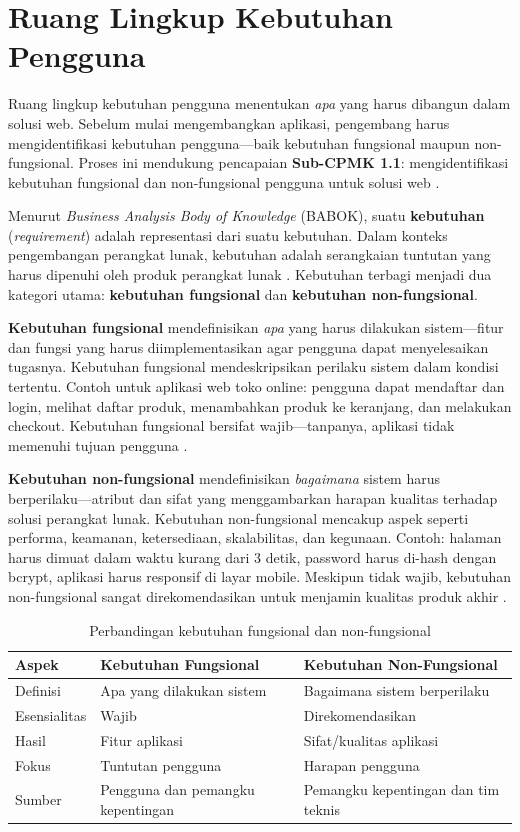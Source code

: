 ﻿\section{Ruang Lingkup Kebutuhan Pengguna}

Ruang lingkup kebutuhan pengguna menentukan \textit{apa} yang harus dibangun dalam solusi web. Sebelum mulai mengembangkan aplikasi, pengembang harus mengidentifikasi kebutuhan pengguna---baik kebutuhan fungsional maupun non-fungsional. Proses ini mendukung pencapaian \textbf{Sub-CPMK 1.1}: mengidentifikasi kebutuhan fungsional dan non-fungsional pengguna untuk solusi web \cite{altexsoftRequirements}.

Menurut \textit{Business Analysis Body of Knowledge} (BABOK), suatu \textbf{kebutuhan} (\textit{requirement}) adalah representasi dari suatu kebutuhan. Dalam konteks pengembangan perangkat lunak, kebutuhan adalah serangkaian tuntutan yang harus dipenuhi oleh produk perangkat lunak \cite{baeldungRequirements}. Kebutuhan terbagi menjadi dua kategori utama: \textbf{kebutuhan fungsional} dan \textbf{kebutuhan non-fungsional}.

\textbf{Kebutuhan fungsional} mendefinisikan \textit{apa} yang harus dilakukan sistem---fitur dan fungsi yang harus diimplementasikan agar pengguna dapat menyelesaikan tugasnya. Kebutuhan fungsional mendeskripsikan perilaku sistem dalam kondisi tertentu. Contoh untuk aplikasi web toko online: pengguna dapat mendaftar dan login, melihat daftar produk, menambahkan produk ke keranjang, dan melakukan checkout. Kebutuhan fungsional bersifat wajib---tanpanya, aplikasi tidak memenuhi tujuan pengguna \cite{altexsoftRequirements}.

\textbf{Kebutuhan non-fungsional} mendefinisikan \textit{bagaimana} sistem harus berperilaku---atribut dan sifat yang menggambarkan harapan kualitas terhadap solusi perangkat lunak. Kebutuhan non-fungsional mencakup aspek seperti performa, keamanan, ketersediaan, skalabilitas, dan kegunaan. Contoh: halaman harus dimuat dalam waktu kurang dari 3 detik, password harus di-hash dengan bcrypt, aplikasi harus responsif di layar mobile. Meskipun tidak wajib, kebutuhan non-fungsional sangat direkomendasikan untuk menjamin kualitas produk akhir \cite{baeldungRequirements}.

\begin{table}[H]
\centering
\begin{tabular}{|P{3cm}|P{5cm}|P{5cm}|}
\hline
\textbf{Aspek} & \textbf{Kebutuhan Fungsional} & \textbf{Kebutuhan Non-Fungsional} \\
\hline
Definisi & Apa yang dilakukan sistem & Bagaimana sistem berperilaku \\
\hline
Esensialitas & Wajib & Direkomendasikan \\
\hline
Hasil & Fitur aplikasi & Sifat/kualitas aplikasi \\
\hline
Fokus & Tuntutan pengguna & Harapan pengguna \\
\hline
Sumber & Pengguna dan pemangku kepentingan & Pemangku kepentingan dan tim teknis \\
\hline
\end{tabular}
\caption{Perbandingan kebutuhan fungsional dan non-fungsional}
\end{table}

